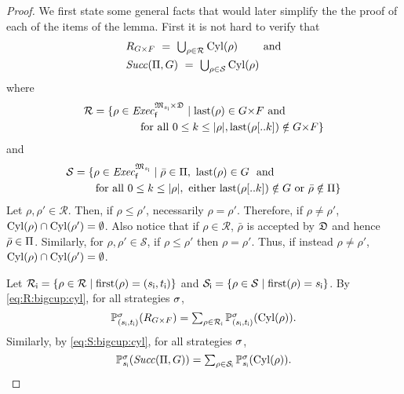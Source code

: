 \begin{proof}
  We first state some general facts that would later simplify the the
  proof of each of the items of the lemma.
  First it is not hard to verify that
  \begin{align}
    & \textstyle
    R_{G{\times}F} \ = \ \bigcup_{\rho\in\mathcal{R}}\mathrm{Cyl}(\rho) \qquad\text{ and}\label{eq:R:bigcup:cyl}\\
    & \textstyle
    \mathit{Succ}(\Pi,G) \ = \ \bigcup_{\rho\in\mathcal{S}}\mathrm{Cyl}(\rho) \label{eq:S:bigcup:cyl}
  \end{align}
  where
  \begin{align*}
    \mathcal{R} = {}
    & \{{\rho\in\mathit{Exec}_{\mathsf{f}}^{{\mathfrak{M}}_{{s_{\textsf{i}}}}{\times}{\mathfrak{D}}}} \mid \mathrm{last}(\rho)\in{G{\times}F}\text{ and}\\
    & \qquad\quad\text{for all }0\leq k\leq{|}{\rho}{|},\mathrm{last}(\rho[..k])\notin{G{\times}F}\}
  \end{align*}
  and
  \begin{align*}
    \mathcal{S} = {}
    & \{{\rho\in\mathit{Exec}_{\mathsf{f}}^{{\mathfrak{M}}_{{s_{\textsf{i}}}}}} \mid {\bar{\rho}\in\Pi}, \ {\mathrm{last}(\rho)\in G} \ \text{ and}\\
    & \ \ \text{for all }0\leq k\leq{|}{\rho}{|}, \text{ either }{\mathrm{last}(\rho[..k])\notin G}\text{ or }{\bar{\rho}\notin\Pi}\}
  \end{align*}
  Let $\rho,\rho'\in\mathcal{R}$.  Then, if $\rho\leq\rho'$,
  necessarily $\rho=\rho'$.  Therefore, if $\rho\neq\rho'$,
  $\mathrm{Cyl}(\rho)\cap\mathrm{Cyl}(\rho')=\emptyset$.  Also notice that if
  $\rho\in\mathcal{R}$, $\bar{\rho}$ is accepted by ${\mathfrak{D}}$ and hence
  $\bar{\rho}\in\Pi$.
  Similarly, for $\rho,\rho'\in\mathcal{S}$, if $\rho\leq\rho'$ then
  $\rho=\rho'$.  Thus, if instead $\rho\neq\rho'$,
  $\mathrm{Cyl}(\rho)\cap\mathrm{Cyl}(\rho')=\emptyset$.

  Let
  $\mathcal{R}_{\mathsf{i}}=\{{\rho\in\mathcal{R}}\mid{\mathrm{first}(\rho)=({s_{\textsf{i}}},{t_{\textsf{i}}})}\}$
  and
  $\mathcal{S}_{\mathsf{i}}=\{{\rho\in\mathcal{S}}\mid{\mathrm{first}(\rho)={s_{\textsf{i}}}}\}$.
  By \cref{eq:R:bigcup:cyl}, for all strategies $\sigma$,
  \begin{equation}\label{eq:prob:R:bigcup:cyl}
    \textstyle
    \mathbb{P}^{\sigma}_{({s_{\textsf{i}}},{t_{\textsf{i}}})}(R_{G{\times}F}) =
    \sum_{\rho\in\mathcal{R}_{\mathsf{i}}}\mathbb{P}^{\sigma}_{({s_{\textsf{i}}},{t_{\textsf{i}}})}(\mathrm{Cyl}(\rho)).
  \end{equation}
  Similarly, by \cref{eq:S:bigcup:cyl}, for all strategies $\sigma$,
  \begin{equation}\label{eq:prob:R:bigcup:cyl}
    \textstyle
    \mathbb{P}^{\sigma}_{{s_{\textsf{i}}}}(\mathit{Succ}(\Pi,G)) =
    \sum_{\rho\in\mathcal{S}_{\mathsf{i}}}\mathbb{P}^{\sigma}_{{s_{\textsf{i}}}}(\mathrm{Cyl}(\rho)).
  \end{equation}


\end{proof}
